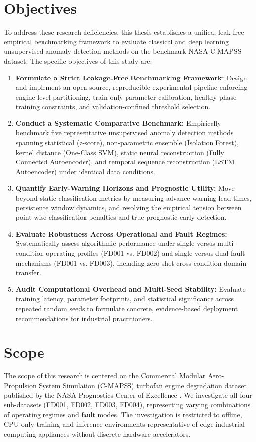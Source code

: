 \documentclass[12pt,a4paper,oneside]{report}
\begin{document}
\section{Objectives}
To address these research deficiencies, this thesis establishes a unified, leak-free empirical benchmarking framework to evaluate classical and deep learning unsupervised anomaly detection methods on the benchmark NASA C-MAPSS dataset. The specific objectives of this study are:
\begin{enumerate}
    \item \textbf{Formulate a Strict Leakage-Free Benchmarking Framework:} Design and implement an open-source, reproducible experimental pipeline enforcing engine-level partitioning, train-only parameter calibration, healthy-phase training constraints, and validation-confined threshold selection.
    \item \textbf{Conduct a Systematic Comparative Benchmark:} Empirically benchmark five representative unsupervised anomaly detection methods spanning statistical (z-score), non-parametric ensemble (Isolation Forest), kernel distance (One-Class SVM), static neural reconstruction (Fully Connected Autoencoder), and temporal sequence reconstruction (LSTM Autoencoder) under identical data conditions.
    \item \textbf{Quantify Early-Warning Horizons and Prognostic Utility:} Move beyond static classification metrics by measuring advance warning lead times, persistence window dynamics, and resolving the empirical tension between point-wise classification penalties and true prognostic early detection.
    \item \textbf{Evaluate Robustness Across Operational and Fault Regimes:} Systematically assess algorithmic performance under single versus multi-condition operating profiles (FD001 vs. FD002) and single versus dual fault mechanisms (FD001 vs. FD003), including zero-shot cross-condition domain transfer.
    \item \textbf{Audit Computational Overhead and Multi-Seed Stability:} Evaluate training latency, parameter footprints, and statistical significance across repeated random seeds to formulate concrete, evidence-based deployment recommendations for industrial practitioners.
\end{enumerate}

\section{Scope}
The scope of this research is centered on the Commercial Modular Aero-Propulsion System Simulation (C-MAPSS) turbofan engine degradation dataset published by the NASA Prognostics Center of Excellence \cite{saxena2008damage}. We investigate all four sub-datasets (FD001, FD002, FD003, FD004), representing varying combinations of operating regimes and fault modes. The investigation is restricted to offline, CPU-only training and inference environments representative of edge industrial computing appliances without discrete hardware accelerators.
\end{document}
